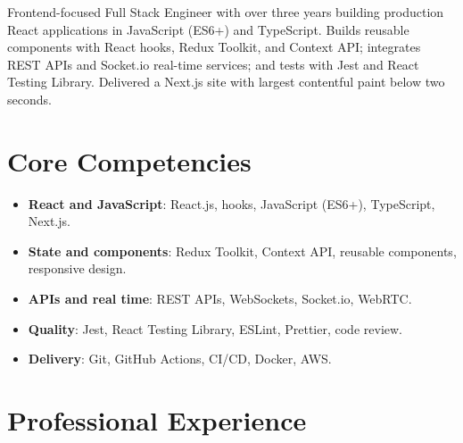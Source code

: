 \documentclass[11pt,a4paper,sans]{moderncv}
\begin{document}
\makecvtitle

\vspace{6pt}
{\small Frontend-focused Full Stack Engineer with over three years building production React applications in JavaScript (ES6+) and TypeScript. Builds reusable components with React hooks, Redux Toolkit, and Context API; integrates REST APIs and Socket.io real-time services; and tests with Jest and React Testing Library. Delivered a Next.js site with largest contentful paint below two seconds.\par}

\section{Core Competencies}
\vspace{1pt}
\begin{itemize}

\item \textbf{React and JavaScript}: React.js, hooks, JavaScript (ES6+), TypeScript, Next.js.

\item \textbf{State and components}: Redux Toolkit, Context API, reusable components, responsive design.

\item \textbf{APIs and real time}: REST APIs, WebSockets, Socket.io, WebRTC.

\item \textbf{Quality}: Jest, React Testing Library, ESLint, Prettier, code review.

\item \textbf{Delivery}: Git, GitHub Actions, CI/CD, Docker, AWS.

\end{itemize}

\section{Professional Experience}
\vspace{3pt}
\end{document}
